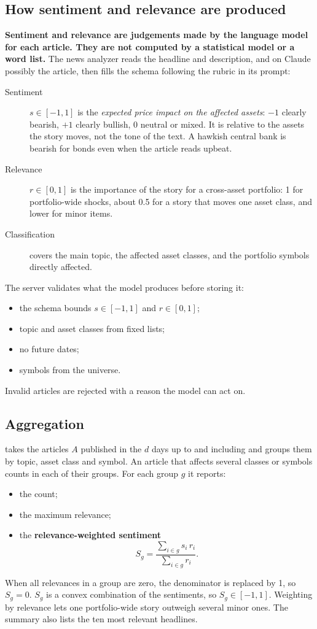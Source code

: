 \documentclass[11pt,a4paper]{article}
\makeatletter
\newcommand{\snippetsource}[1]{\csname snippet@#1\endcsname}
\newcommand{\snippet}[3]{%
  }
\makeatother
\begin{document}
\subsection{How sentiment and relevance are produced}
\textbf{Sentiment and relevance are judgements made by the language model for each article.
They are not computed by a statistical model or a word list.} The news analyzer reads the
headline and description, and on Claude possibly the article, then fills the
 schema following the rubric in its prompt:
\begin{description}
  \item[Sentiment] $s\in[-1,1]$ is the \emph{expected price impact on the affected assets}:
        $-1$ clearly bearish, $+1$ clearly bullish, $0$ neutral or mixed. It is relative to
        the assets the story moves, not the tone of the text. A hawkish central bank is
        bearish for bonds even when the article reads upbeat.
  \item[Relevance] $r\in[0,1]$ is the importance of the story for a cross-asset
        portfolio: 1 for portfolio-wide shocks, about 0.5 for a story that moves one asset
        class, and lower for minor items.
  \item[Classification] covers the main topic, the affected asset classes, and the
        portfolio symbols directly affected.
\end{description}
The server validates what the model produces before storing it:
\begin{itemize}
  \item the schema bounds $s\in[-1,1]$ and $r\in[0,1]$;
  \item topic and asset classes from fixed lists;
  \item no future dates;
  \item symbols from the universe.
\end{itemize}
Invalid articles are rejected with a reason the model can act on.
\snippet{news_article}{Python}{Article schema}
\snippet{store_news_articles}{Python}{Validation before storage}

\subsection{Aggregation}
 takes the articles $A$ published in the $d$ days up to and including
 and groups them by topic, asset class and symbol. An article that affects
several classes or symbols counts in each of their groups. For each group $g$ it reports:
\begin{itemize}
  \item the count;
  \item the maximum relevance;
  \item the \textbf{relevance-weighted sentiment}
\[
  S_g=\frac{\sum_{i\in g}s_i\,r_i}{\sum_{i\in g}r_i}.
\]
\end{itemize}
When all relevances in a group are zero, the denominator is replaced by 1, so $S_g=0$.
$S_g$ is a convex combination of the sentiments, so $S_g\in[-1,1]$. Weighting by relevance
lets one portfolio-wide story outweigh several minor ones. The summary also lists the ten
most relevant headlines.
\end{document}

